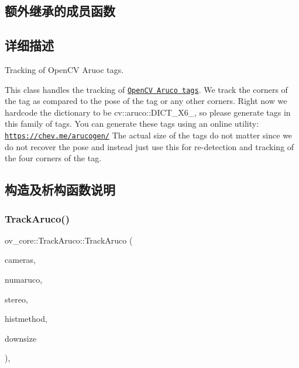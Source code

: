 \subsection*{额外继承的成员函数}


\subsection{详细描述}
Tracking of Open\+CV Aruoc tags. 

This class handles the tracking of \href{https://github.com/opencv/opencv_contrib/tree/master/modules/aruco}{\tt Open\+CV Aruco tags}. We track the corners of the tag as compared to the pose of the tag or any other corners. Right now we hardcode the dictionary to be {\ttfamily cv\+::aruco\+::\+D\+I\+C\+T\+\_\+X6\+\_}, so please generate tags in this family of tags. You can generate these tags using an online utility\+: \href{https://chev.me/arucogen/}{\tt https\+://chev.\+me/arucogen/} The actual size of the tags do not matter since we do not recover the pose and instead just use this for re-\/detection and tracking of the four corners of the tag. 

\subsection{构造及析构函数说明}
\mbox{\label{classov__core_1_1TrackAruco_adaa89be7ced3917bdedc89d69a2269a4}} 
\subsubsection{\texorpdfstring{Track\+Aruco()}{TrackAruco()}}
{\footnotesize\ttfamily ov\+\_\+core\+::\+Track\+Aruco\+::\+Track\+Aruco (\begin{DoxyParamCaption}\item[{std\+::unordered\+\_\+map$<$ size\+\_\+t, std\+::shared\+\_\+ptr$<$ \hyperlink{classov__core_1_1CamBase}{Cam\+Base} $>$$>$}]{cameras,  }\item[{int}]{numaruco,  }\item[{bool}]{stereo,  }\item[{\hyperlink{classov__core_1_1TrackBase_aa4b34a5dce99b59522d57bf9278c9a1a}{Histogram\+Method}}]{histmethod,  }\item[{bool}]{downsize }\end{DoxyParamCaption})\hspace{0.3cm}{\ttfamily [inline]}, {\ttfamily [explicit]}}



